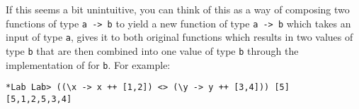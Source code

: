 \taskLine 


If this seems a bit unintuitive, you can think of this as a way of composing two functions of type \texttt{\small a -> b} to yield a new function of type \texttt{\small a -> b} which takes an input of type \texttt{\small a}, gives it to both original functions which results in two values of type \texttt{\small b} that are then combined into one value of type \texttt{\small b} through the implementation of \haskellIn{(<>)} for \texttt{\small b}. For example:
\begin{verbatim}
*Lab Lab> ((\x -> x ++ [1,2]) <> (\y -> y ++ [3,4])) [5]
[5,1,2,5,3,4]
\end{verbatim}

\taskLine 